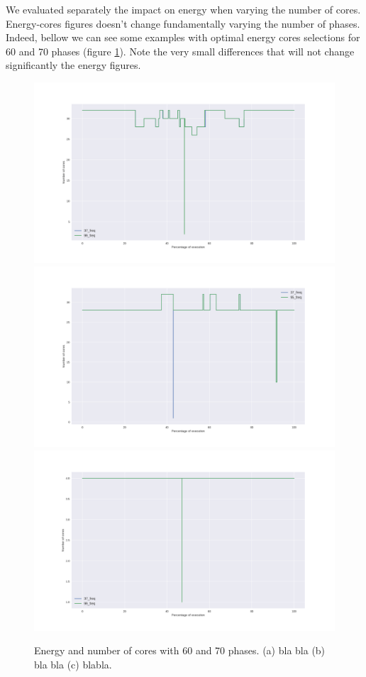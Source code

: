 We evaluated separately the impact on energy when varying the number of cores. Energy-cores figures doesn't change fundamentally varying the number of phases. Indeed, bellow we can see some examples with optimal energy cores selections for 60 and 70 phases (figure \ref{fig:cores_control}). Note the very small differences that will not change significantly the energy figures.

\begin{figure}[h]
\includegraphics[width=\columnwidth]{phases/figures/signals/completo_black_3_cores_signals_cmp.png}
\includegraphics[width=\columnwidth]{phases/figures/signals/completo_bodytrack_3_cores_signals_cmp.png}
\includegraphics[width=\columnwidth]{phases/figures/signals/completo_canneal_4_cores_signals_cmp.png}  
\caption{Energy and number of cores with 60 and 70 phases. (a) bla bla (b) bla bla (c) blabla.}
    \label{fig:cores_control}
\end{figure}

